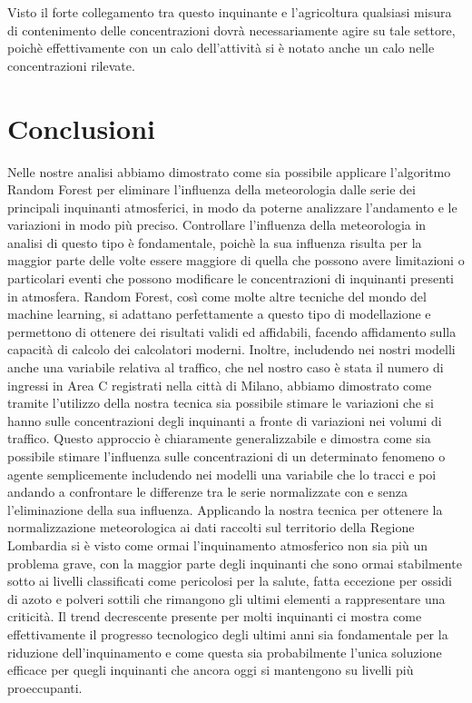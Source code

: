 \documentclass[a4paper]{report}
\begin{document}
Visto il forte collegamento tra questo inquinante e l'agricoltura qualsiasi misura di contenimento delle concentrazioni dovrà necessariamente agire su tale settore, poichè effettivamente con un calo dell'attività si è notato anche un calo nelle concentrazioni rilevate.

\chapter{Conclusioni}
Nelle nostre analisi abbiamo dimostrato come sia possibile applicare l'algoritmo Random Forest per eliminare l'influenza della meteorologia dalle serie dei principali inquinanti atmosferici, in modo da poterne analizzare l'andamento e le variazioni in modo più preciso.  
Controllare l'influenza della meteorologia in analisi di questo tipo è fondamentale, poichè la sua influenza risulta per la maggior parte delle volte essere maggiore di quella che possono avere limitazioni o particolari eventi che possono modificare le concentrazioni di inquinanti presenti in atmosfera. Random Forest, così come molte altre tecniche del mondo del machine learning, si adattano perfettamente a questo tipo di modellazione e permettono di ottenere dei risultati validi ed affidabili, facendo affidamento sulla capacità di calcolo dei calcolatori moderni.  
Inoltre, includendo nei nostri modelli anche una variabile relativa al traffico, che nel nostro caso è stata il numero di ingressi in Area C registrati nella città di Milano, abbiamo dimostrato come tramite l'utilizzo della nostra tecnica sia possibile stimare le variazioni che si hanno sulle concentrazioni degli inquinanti a fronte di variazioni nei volumi di traffico. Questo approccio è chiaramente generalizzabile e dimostra come sia possibile stimare l'influenza sulle concentrazioni di un determinato fenomeno o agente semplicemente includendo nei modelli una variabile che lo tracci e poi andando a confrontare le differenze tra le serie normalizzate con e senza l'eliminazione della sua influenza.
Applicando la nostra tecnica per ottenere la normalizzazione meteorologica ai dati raccolti sul territorio della Regione Lombardia si è visto come ormai l'inquinamento atmosferico non sia più un problema grave, con la maggior parte degli inquinanti che sono ormai stabilmente sotto ai livelli classificati come pericolosi per la salute, fatta eccezione per ossidi di azoto e polveri sottili che rimangono gli ultimi elementi a rappresentare una criticità. 
Il trend decrescente presente per molti inquinanti ci mostra come effettivamente il progresso tecnologico degli ultimi anni sia fondamentale per la riduzione dell'inquinamento e come questa sia probabilmente l'unica soluzione efficace per quegli inquinanti che ancora oggi si mantengono su livelli più proeccupanti.  
\end{document}

